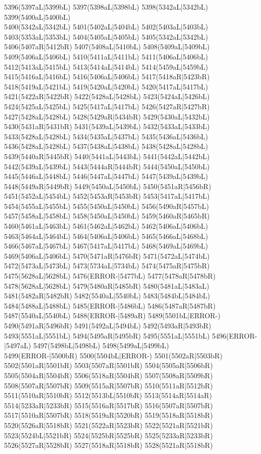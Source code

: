 5396(5397aL|5399bL) 5397(5398aL|5398bL) 5398(5342aL|5342bL) 5399(5400aL|5400bL) \\5400(5342aL|5342bL) 5401(5402aL|5404bL) 5402(5403aL|5403bL) 5403(5353aL|5353bL) 5404(5405aL|5405bL) 5405(5342aL|5342bL) 5406(5407aR|5412bR) 5407(5408aL|5410bL) 5408(5409aL|5409bL) \\5409(5406aL|5406bL) 5410(5411aL|5411bL) 5411(5406aL|5406bL) 5412(5413aL|5415bL) 5413(5414aL|5414bL) 5414(5459aL|5459bL) 5415(5416aL|5416bL) 5416(5406aL|5406bL) 5417(5418aR|5423bR) \\5418(5419aL|5421bL) 5419(5420aL|5420bL) 5420(5417aL|5417bL) 5421(5422aR|5422bR) 5422(5428aL|5428bL) 5423(5424aL|5426bL) 5424(5425aL|5425bL) 5425(5417aL|5417bL) 5426(5427aR|5427bR) \\5427(5428aL|5428bL) 5428(5429aR|5434bR) 5429(5430aL|5432bL) 5430(5431aR|5431bR) 5431(5439aL|5439bL) 5432(5433aL|5433bL) 5433(5428aL|5428bL) 5434(5435aL|5437bL) 5435(5436aL|5436bL) \\5436(5428aL|5428bL) 5437(5438aL|5438bL) 5438(5428aL|5428bL) 5439(5440aR|5445bR) 5440(5441aL|5443bL) 5441(5442aL|5442bL) 5442(5439aL|5439bL) 5443(5444aR|5444bR) 5444(5450aL|5450bL) \\5445(5446aL|5448bL) 5446(5447aL|5447bL) 5447(5439aL|5439bL) 5448(5449aR|5449bR) 5449(5450aL|5450bL) 5450(5451aR|5456bR) 5451(5452aL|5454bL) 5452(5453aR|5453bR) 5453(5417aL|5417bL) \\5454(5455aL|5455bL) 5455(5450aL|5450bL) 5456(5490aR|5457bL) 5457(5458aL|5458bL) 5458(5450aL|5450bL) 5459(5460aR|5465bR) 5460(5461aL|5463bL) 5461(5462aL|5462bL) 5462(5406aL|5406bL) \\5463(5464aL|5464bL) 5464(5406aL|5406bL) 5465(5466aL|5468bL) 5466(5467aL|5467bL) 5467(5417aL|5417bL) 5468(5469aL|5469bL) 5469(5406aL|5406bL) 5470(5471aR|5476bR) 5471(5472aL|5474bL) \\5472(5473aL|5473bL) 5473(5734aL|5734bL) 5474(5475aR|5475bR) 5475(5628aL|5628bL) 5476(ERROR-|5477bL) 5477(5478aR|5478bR) 5478(5628aL|5628bL) 5479(5480aR|5485bR) 5480(5481aL|5483aL) \\5481(5482aR|5482bR) 5482(5540aL|5540bL) 5483(5484bL|5484bL) 5484(5488aL|5488bL) 5485(ERROR-|5486bL) 5486(5487aR|5487bR) 5487(5540aL|5540bL) 5488(ERROR-|5489aR) 5489(5501bL|ERROR-) \\5490(5491aR|5496bR) 5491(5492aL|5494bL) 5492(5493aR|5493bR) 5493(5551aL|5551bL) 5494(5495aR|5495bR) 5495(5551aL|5551bL) 5496(ERROR-|5497aL) 5497(5498bL|5498bL) 5498(5499aL|5499bL) \\5499(ERROR-|5500bR) 5500(5504bL|ERROR-) 5501(5502aR|5503bR) 5502(5501aR|5501bR) 5503(5507aR|5501bR) 5504(5505aR|5506bR) 5505(5504aR|5504bR) 5506(5518aR|5504bR) 5507(5508aR|5509bR) \\5508(5507aR|5507bR) 5509(5515aR|5507bR) 5510(5511aR|5512bR) 5511(5510aR|5510bR) 5512(5513bL|5510bR) 5513(5514aR|5514aR) 5514(5233aR|5233bR) 5515(5516aR|5517bR) 5516(5507aR|5507bR) \\5517(5510aR|5507bR) 5518(5519aR|5520bR) 5519(5518aR|5518bR) 5520(5526aR|5518bR) 5521(5522aR|5523bR) 5522(5521aR|5521bR) 5523(5524bL|5521bR) 5524(5525bR|5525bR) 5525(5233aR|5233bR) \\5526(5527aR|5528bR) 5527(5518aR|5518bR) 5528(5521aR|5518bR) 